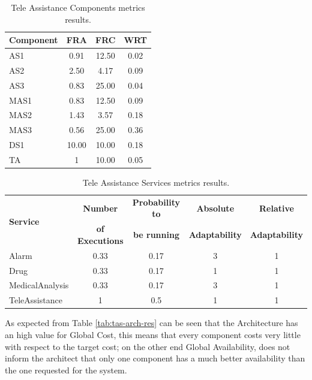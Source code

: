\begin{table}[ht!b]
	\centering
	\begin{tabular}{|l|c|c|c|}
		\hline 
		\textbf{Component} & \textbf{FRA} & \textbf{FRC} & \textbf{WRT} \\ 
		\hline 
		AS1 & 0.91 & 12.50 & 0.02 \\
		\hline 
		AS2 & 2.50 & 4.17 & 0.09 \\
		\hline 
		AS3 & 0.83 & 25.00 & 0.04 \\
		\hline 
		MAS1 & 0.83 & 12.50 & 0.09 \\
		\hline
		MAS2 & 1.43 & 3.57 & 0.18 \\
		\hline
		MAS3 & 0.56 & 25.00 & 0.36 \\
		\hline
		DS1 & 10.00 & 10.00 & 0.18 \\
		\hline
		TA & 1 & 10.00 & 0.05 \\
		\hline
	\end{tabular} 
	\caption[TAS Service Components Metrics]{Tele Assistance Components metrics results.}
	\label{tab:tas-comp-res}
\end{table}

\begin{table}[ht!b]
	\centering
	\begin{tabular}{|l|c|c|c|c|}
		\hline 
		\multirow{2}{*}{\textbf{Service}} & \textbf{Number} & \textbf{Probability to} & \textbf{Absolute} & \textbf{Relative} \\ 
		& \textbf{of Executions} & \textbf{be running} & \textbf{Adaptability} & \textbf{Adaptability} \\
		\hline 
		Alarm & 0.33 & 0.17 & 3 & 1 \\
		\hline 
		Drug & 0.33 & 0.17 & 1 & 1 \\
		\hline 
		MedicalAnalysis & 0.33 & 0.17 & 3 & 1 \\
		\hline 
		TeleAssistance & 1 & 0.5 & 1 & 1 \\
		\hline
	\end{tabular} 
	\caption[TAS Service Services Metrics]{Tele Assistance Services metrics results.}
	\label{tab:tas-serv-res}
\end{table}

As expected from Table \ref{tab:tas-arch-res} can be seen that the Architecture has an high value for Global Cost, this means that every component costs very little with respect to the target cost; on the other end Global Availability, does not inform the architect that only one component has a much better availability than the one requested for the system. 

